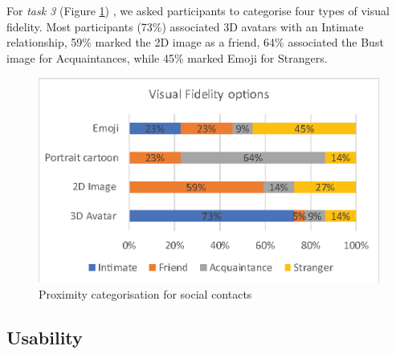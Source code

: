 For \textit{task 3} 
(Figure \ref{fig:contacts:proximity})
, we asked participants to categorise four types of visual fidelity. Most participants (73\%) associated 3D avatars with an Intimate relationship, 59\% marked the 2D image as a  friend, 64\% associated the Bust image for Acquaintances, while 45\% marked Emoji for Strangers.




\begin{figure}[ht]
    \centering
    \includegraphics[width=.8\linewidth]{images/mgia17/analysis-images-01.eps}
    \caption{Proximity categorisation for social contacts}
    \label{fig:contacts:proximity}
\end{figure}

\subsection{Usability}

